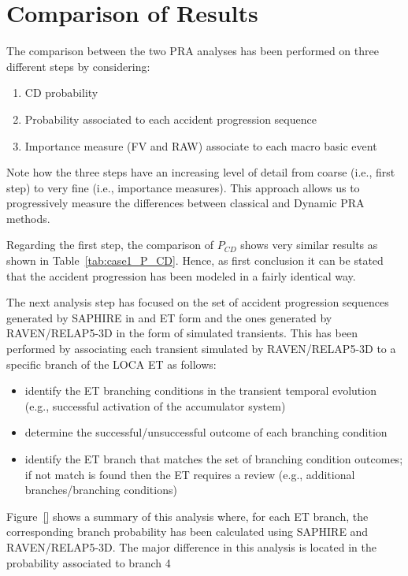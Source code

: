 \section{Comparison of Results }
\label{sec:comparison}

The comparison between the two PRA analyses has been performed on three different steps by considering:
\begin{enumerate}
	\item CD probability
	\item Probability associated to each accident progression sequence
	\item Importance measure (FV and RAW) associate to each macro basic event
\end{enumerate}
Note how the three steps have an increasing level of detail from coarse (i.e., first step) to very fine 
(i.e., importance measures).
This approach allows us to progressively measure the differences between classical and Dynamic PRA methods.

Regarding the first step, the comparison of $P_{CD}$ shows very similar results as shown in 
Table~\ref{tab:case1_P_CD}. Hence, as first conclusion it can be stated that the accident progression has been
modeled in a fairly identical way.

The next analysis step has focused on the set of accident progression sequences generated by SAPHIRE in and 
ET form and the ones generated by RAVEN/RELAP5-3D in the form of simulated transients.
This has been performed by associating each transient simulated by RAVEN/RELAP5-3D to a specific branch of the 
LOCA ET as follows:
\begin{itemize}
  \item identify the ET branching conditions in the transient temporal evolution (e.g., successful activation of 
        the accumulator system)
  \item determine the successful/unsuccessful outcome of each branching condition
  \item identify the ET branch that matches the set of branching condition outcomes; if not match is found then
        the ET requires a review (e.g., additional branches/branching conditions)
\end{itemize}

Figure~\ref{} shows a summary of this analysis where, for each ET branch, the corresponding branch probability 
has been calculated using SAPHIRE and RAVEN/RELAP5-3D.
The major difference in this analysis is located in the probability associated to branch 4 

